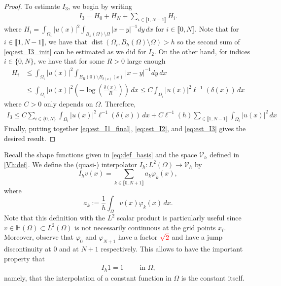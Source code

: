 \documentclass[10 pt]{article}
\newcommand\inter[1]{\llbracket #1\rrbracket}
\numberwithin{equation}{section}
\def\dist{\operatorname{dist}}
\newcommand{\B}[1]{{\color{red} #1}}  %
\begin{document}
\begin{proof}
To estimate $I_3$, we begin by writing
%
\begin{align}\label{eq:est_I3_init}
    I_3=H_0+H_N+\sum_{i\in\inter{1,N-1}}H_i.
\end{align}
%
where $H_i=\int_{\Omega_i}|u(x)|^2\int_{B_h(\Omega)\setminus \Omega}|x-y|^{-1}dy\,dx$ for $i\in\inter{0,N}$. Note that for $i\in\inter{1,N-1}$, we have that $\dist(\Omega_i,B_h(\Omega)\setminus\Omega)>h$ so the second sum of \eqref{eq:est_I3_init} can be estimated as we did for $I_2$. On the other hand, for indices $i\in\{0,N\}$, we have that for some $R>0$ large enough
%
\begin{align*}
    H_i&\leq \int_{\Omega_i}|u(x)|^2\int_{B_R(0)\setminus B_{\delta(x)}(x)}|x-y|^{-1}dy\,dx \\
    &\leq \int_{\Omega_i}|u(x)|^2\left(-\log\left(\tfrac{\delta(x)}{R}\right)\right)\,dx \leq C \int_{\Omega_i}|u(x)|^2\ell^{-1}(\delta(x))\,dx
\end{align*}
%
where $C>0$ only depends on $\Omega$. Therefore,
%
\begin{align}\label{eq:est_I3}
    I_3\leq C \sum_{i\in\{0,N\}}\int_{\Omega_i}|u(x)|^2\ell^{-1}(\delta(x))\,dx + C\ell^{-1}(h)\sum_{\in\inter{1,N-1}}\int_{\Omega_i}|u(x)|^2\,dx
\end{align}
%
Finally, putting together \eqref{eq:est_I1_final}, \eqref{eq:est_I2}, and \eqref{eq:est_I3} gives the desired result. 
%
\end{proof}


Recall the shape functions given in \eqref{eq:def_basis} and the space $\mathcal V_h$ defined in \eqref{Vh:def}. We define the (quasi-) interpolator $I_h:L^2(\Omega)\to \mathcal V_h$ by
%
\begin{equation}\label{eq:interpolator}
I_h v(x)=\sum_{k\in\inter{0,N+1}}a_k \varphi_k(x),
\end{equation}
where
%
\begin{equation}\label{eq:def_coeff_ak}
  a_k:=\frac{1}{h}\int_{\Omega}v(x)\varphi_k(x)\,dx.
\end{equation}
%
Note that this definition with the $L^2$ scalar product is particularly useful since $v\in\mathbb H(\Omega)\subset L^2(\Omega)$ is not necessarily continuous at the grid points $x_i$.  Moreover, observe that $\varphi_0$ and $\varphi_{N+1}$ have a factor $\B{\sqrt{2}}$ and have a jump discontinuity at $0$ and at $N+1$ respectively.  This allows to have the important property that
\begin{align}\label{Ihc}
I_h 1 = 1\qquad \text{ in $\Omega$,}
\end{align}
namely, that the interpolation of a constant function in $\Omega$ is the constant itself.
\end{document}

